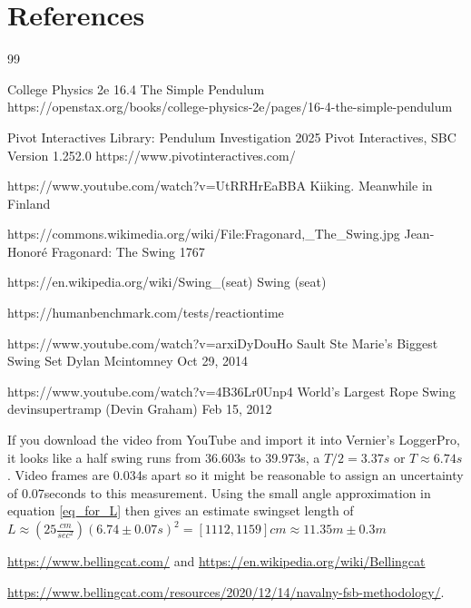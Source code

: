 \documentclass[12pt]{iopart}
\begin{document}
\section*{References}
\begin{thebibliography}{99}

College Physics 2e
16.4 The Simple Pendulum
https://openstax.org/books/college-physics-2e/pages/16-4-the-simple-pendulum

Pivot Interactives Library: Pendulum Investigation
2025 Pivot Interactives, SBC
Version 1.252.0
https://www.pivotinteractives.com/

https://www.youtube.com/watch?v=UtRRHrEaBBA
Kiiking. Meanwhile in Finland

	https://commons.wikimedia.org/wiki/File:Fragonard,\_The\_Swing.jpg
	Jean-Honoré Fragonard: The Swing 
	1767

	https://en.wikipedia.org/wiki/Swing\_(seat)
		Swing (seat)

https://humanbenchmark.com/tests/reactiontime

https://www.youtube.com/watch?v=arxiDyDouHo
Sault Ste Marie's Biggest Swing Set
Dylan Mcintomney
Oct 29, 2014

https://www.youtube.com/watch?v=4B36Lr0Unp4
World's Largest Rope Swing
devinsupertramp (Devin Graham)
Feb 15, 2012

 If you download the video from YouTube and import it into Vernier's LoggerPro, it looks like a half swing runs from 36.603s to 39.973s, a $T/2=3.37s$ or $T\approx6.74s$.  Video frames are 0.034s apart so it might be reasonable to assign an uncertainty of 0.07seconds to this measurement.  Using the small angle approximation in equation \ref{eq_for_L} then gives an estimate swingset length of  
$L \approx \left( 25 \frac{cm}{sec^2} \right) (6.74\pm0.07s)^2 = [1112,1159]cm \approx 11.35 m \pm 0.3m$

\href{https://www.bellingcat.com/}{https://www.bellingcat.com/} and 
\href{https://en.wikipedia.org/wiki/Bellingcat}{https://en.wikipedia.org/wiki/Bellingcat}

\href{https://www.bellingcat.com/resources/2020/12/14/navalny-fsb-methodology/}{https://www.bellingcat.com/resources/2020/12/14/navalny-fsb-methodology/}. 


\end{thebibliography}
\end{document}
